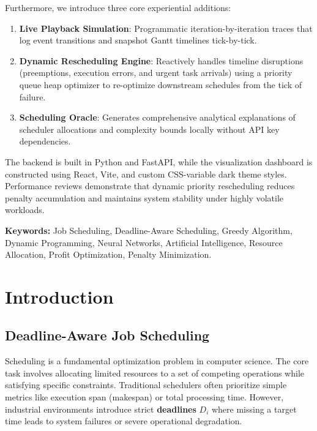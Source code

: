 \documentclass[12pt,a4paper]{article}
\begin{document}
\noindent
Furthermore, we introduce three core experiential additions:
\begin{enumerate}
    \item \textbf{Live Playback Simulation}: Programmatic iteration-by-iteration traces that log event transitions and snapshot Gantt timelines tick-by-tick.
    \item \textbf{Dynamic Rescheduling Engine}: Reactively handles timeline disruptions (preemptions, execution errors, and urgent task arrivals) using a priority queue heap optimizer to re-optimize downstream schedules from the tick of failure.
    \item \textbf{Scheduling Oracle}: Generates comprehensive analytical explanations of scheduler allocations and complexity bounds locally without API key dependencies.
\end{enumerate}
The backend is built in Python and FastAPI, while the visualization dashboard is constructed using React, Vite, and custom CSS-variable dark theme styles. Performance reviews demonstrate that dynamic priority rescheduling reduces penalty accumulation and maintains system stability under highly volatile workloads.

\vspace{1cm}
\noindent
\textbf{Keywords:} Job Scheduling, Deadline-Aware Scheduling, Greedy Algorithm, Dynamic Programming, Neural Networks, Artificial Intelligence, Resource Allocation, Profit Optimization, Penalty Minimization.

\newpage

\section{Introduction}

\subsection{Deadline-Aware Job Scheduling}
Scheduling is a fundamental optimization problem in computer science. The core task involves allocating limited resources to a set of competing operations while satisfying specific constraints. Traditional schedulers often prioritize simple metrics like execution span (makespan) or total processing time. However, industrial environments introduce strict \textbf{deadlines} $D_i$ where missing a target time leads to system failures or severe operational degradation.
\end{document}

